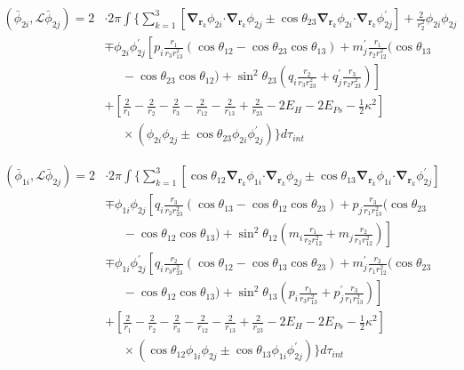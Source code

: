 \documentclass[Dissertation.tex]{subfiles}
\begin{document}
\begin{align}
\label{eq:PWavePhi2Phi2}
\left(\bar{\phi}_{2i},\mathcal{L} \bar{\phi}_{2j}\right) = 2 & \cdot 2\pi \int \Bigg\{ \sum_{k=1}^3 \left[ \boldsymbol{\nabla}_{\!\mathbf{r}_k} \nonumber \phi_{2i} \boldsymbol{\cdot} \boldsymbol{\nabla}_{\!\mathbf{r}_k} \phi_{2j} \pm \cos\theta_{23} \boldsymbol{\nabla}_{\!\mathbf{r}_k} \phi_{2i} \boldsymbol{\cdot} \boldsymbol{\nabla}_{\!\mathbf{r}_k} \phi_{2j}^\prime \right]  + \frac{2}{r_2^2}\phi_{2i}\phi_{2j} \\
 \nonumber &\mp \phi_{2i} \phi_{2j}^\prime \left[p_i \frac{r_1}{r_3 r_{13}^2} (\cos\theta_{12} - \cos\theta_{23} \cos\theta_{13}) + m_j^\prime \frac{r_1}{r_2 r_{12}^2}(\cos\theta_{13}\right.\\
 \nonumber & \left. \;\;\;\;\; -\cos\theta_{23} \cos\theta_{12}) + \sin^2\theta_{23} \left(q_i \frac{r_2}{r_3 r_{23}^2} + q_j^\prime \frac{r_3}{r_2 r_{23}^2} \right) \right] \\
 \nonumber &+ \left. \left[\frac{2}{r_1} - \frac{2}{r_2} - \frac{2}{r_3} - \frac{2}{r_{12}} - \frac{2}{r_{13}} + \frac{2}{r_{23}} - 2 E_H - 2 E_{Ps} - \frac{1}{2}\kappa^2 \right] \right. \\
 &\;\;\;\;\; \times \left(\phi_{2i} \phi_{2j} \pm \cos\theta_{23} \phi_{2i} \phi_{2j}^\prime \right) \Bigg\} d\tau_{int}
\end{align}

\begin{align}
\label{eq:PWavePhi1Phi2}
\left(\bar{\phi}_{1i},\mathcal{L} \bar{\phi}_{2j}\right) = 2 & \cdot 2\pi \int \Bigg\{ \sum_{k=1}^3 \left[ \cos\theta_{12} \boldsymbol{\nabla}_{\!\mathbf{r}_k} \nonumber \phi_{1i} \boldsymbol{\cdot} \boldsymbol{\nabla}_{\!\mathbf{r}_k} \phi_{2j} \pm \cos\theta_{13} \boldsymbol{\nabla}_{\!\mathbf{r}_k} \phi_{1i} \boldsymbol{\cdot} \boldsymbol{\nabla}_{\!\mathbf{r}_k} \phi_{2j}^\prime \right] \\
 \nonumber &\mp \phi_{1i} \phi_{2j} \left[q_i \frac{r_3}{r_2 r_{23}^2} (\cos\theta_{13} - \cos\theta_{12} \cos\theta_{23}) + p_j \frac{r_3}{r_1 r_{13}^2}(\cos\theta_{23}\right.\\
 \nonumber & \left. \;\;\;\;\; -\cos\theta_{12} \cos\theta_{13}) + \sin^2\theta_{12} \left(m_i \frac{r_1}{r_2 r_{12}^2} + m_j \frac{r_2}{r_1 r_{12}^2} \right) \right] \\
 \nonumber &\mp \phi_{1i} \phi_{2j}^\prime \left[q_i \frac{r_2}{r_3 r_{23}^2} (\cos\theta_{12} - \cos\theta_{13} \cos\theta_{23}) + m_j^\prime \frac{r_2}{r_1 r_{12}^2}(\cos\theta_{23}\right.\\
 \nonumber & \left. \;\;\;\;\; -\cos\theta_{12} \cos\theta_{13}) + \sin^2\theta_{13} \left(p_i \frac{r_1}{r_3 r_{13}^2} + p_j^\prime \frac{r_3}{r_1 r_{13}^2} \right) \right] \\
 \nonumber &+ \left. \left[\frac{2}{r_1} - \frac{2}{r_2} - \frac{2}{r_3} - \frac{2}{r_{12}} - \frac{2}{r_{13}} + \frac{2}{r_{23}} - 2 E_H - 2 E_{Ps} - \frac{1}{2}\kappa^2 \right] \right. \\
 &\;\;\;\;\; \times \left(\cos\theta_{12} \phi_{1i} \phi_{2j} \pm \cos\theta_{13} \phi_{1i} \phi_{2j}^\prime \right) \Bigg\} d\tau_{int}
\end{align}
\end{document}
